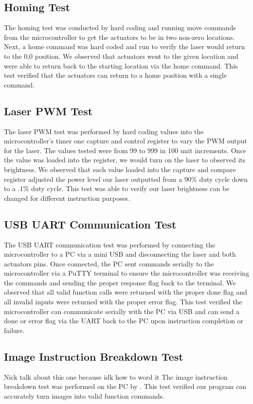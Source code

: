 \documentclass[11pt]{LaTeX-Classes/math-hw}
\begin{document}
\subsection{Homing Test}
The homing test was conducted by hard coding and running move commands from the microcontroller to get the actuators to be in two non-zero locations. Next, a home command was hard coded and run to verify the laser would return to the 0,0 position. We observed that actuators went to the given location and were able to return back to the starting location via the home command. This test verified that the actuators can return to a home position with a single command.  

\subsection{Laser PWM Test}
The laser PWM test was performed by hard coding values into the microcontroller's timer one capture and control register to vary the PWM output for the laser. The values tested were from 99 to 999 in 100 unit increments. Once the value was loaded into the register, we would turn on the laser to observed its brightness. We observed that each value loaded into the capture and compare register adjusted the power level our laser outputted from a 90\% duty cycle down to a .1\% duty cycle. This test was able to verify our laser brightness can be changed for different instruction purposes.
 
\subsection{USB UART Communication Test}
The USB UART communication test was performed by connecting the microcontroller to a PC via a mini USB and disconnecting the laser and both actuators pins. Once connected, the PC sent commands serially to the microcontroller via a PuTTY terminal to ensure the microcontroller was receiving the commands and sending the proper response flag back to the terminal. We observed that all valid function calls were returned with the proper done flag and all invalid inputs were returned with the proper error flag. This test verified the microcontroller can communicate serially with the PC via USB and can send a done or error flag via the UART back to the PC upon instruction completion or failure.

\subsection{Image Instruction Breakdown Test} Nick talk about this one because idk how to word it
The image instruction breakdown test was performed on the PC by . This test verified our program can accurately turn images into valid function commands. 
\end{document}
